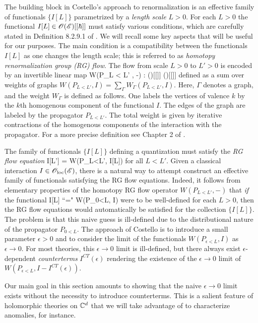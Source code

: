 \documentclass[11pt]{amsart}
\begin{document}
The building block in Costello's approach to renormalization is an effective family of functionals $\{I[L]\}$ parametrized by a {\em length scale} $L > 0$. 
For each $L > 0$ the functional $I[L] \in \mathscr O(\mathscr E)[[\hbar]]$ must satisfy various conditions, which are carefully stated in Definition 8.2.9.1 of \cite{CG2}. 
We will recall some key aspects that will be useful for our purposes. 
The main condition is a compatibility between the functionals $I[L]$ as one changes the length scale; this is referred to as {\em homotopy renormalization group (RG) flow}.
The flow from scale $L>0$ to $L'>0$ is encoded by an invertible linear map
\ben
W(P_{L < L'} , -) : \sO(\sE)[[\hbar]] \to \sO(\sE)[[\hbar]]
\een
defined as a sum over weights of graphs $W (P_{L<L'}, I) = \sum_{\Gamma} W_{\Gamma}(P_{L<L'}, I)$. 
Here, $\Gamma$ denotes a graph, and the weight $W_\Gamma$ is defined as follows.
One labels the vertices of valence $k$ by the $k$th homogenous component of the functional $I$. 
The edges of the graph are labeled by the propagator $P_{L<L'}$.
The total weight is given by iterative contractions of the homogenous components of the interaction with the propagator. 
For a more precise definition see Chapter 2 of \cite{CosRenorm}.

The family of functionals $\{I[L]\}$ defining a quantization must satisfy the {\em RG flow equation}
\ben
I[L'] = W(P_{L<L'}, I[L])
\een
for all $L < L'$. 
Given a classical interaction $I \in {\mathscr O}_{\rm loc}(\mathscr E)$, there is a natural way to attempt construct an effective family of functionals satisfying the RG flow equations.
Indeed, it follows from elementary properties of the homotopy RG flow operator $W(P_{L < L'}, -)$ that {\em if} the functional
\ben
I[L] \;\; ``=" \;\; W(P_{0<L}, I) 
\een
were to be well-defined for each $L >0$, then the RG flow equations would automatically be satisfied for the collection $\{I[L]\}$. 
The problem is that this naive guess is ill-defined due to the distributional nature of the propagator $P_{0<L}$. 
The approach of Costello is to introduce a small parameter $\epsilon > 0$ and to consider the limit of the functionals $W(P_{\epsilon < L}, I)$ as $\epsilon \to 0$. 
For most theories, this $\epsilon \to 0$ limit is ill-defined, but there always exist $\epsilon$-dependent {\em counterterms} $I^{CT}(\epsilon)$ rendering the existence of the $\epsilon \to 0$ limit of $W(P_{\epsilon < L}, I - I^{CT}(\epsilon))$. 

Our main goal in this section amounts to showing that the naive $\epsilon \to 0$ limit exists without the necessity to introduce counterterms. 
This is a salient feature of holomorphic theories on $\mathbb C^d$ that we will take advantage of to characterize anomalies, for instance. 
\end{document}
